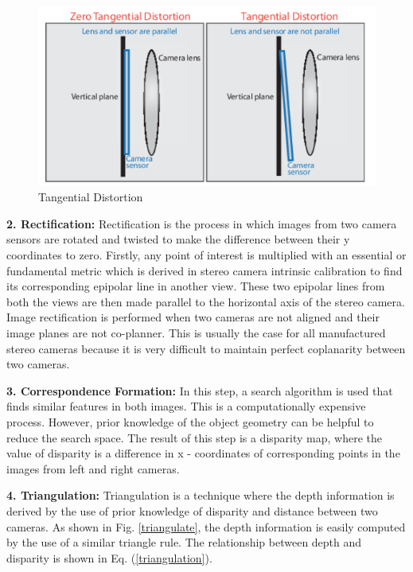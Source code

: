 \begin{figure}
    \centering
    \includegraphics[scale= 0.7]{Images/tangential.png}
    \caption{Tangential Distortion \cite{MATLAB_camera}}
    \label{tangential}
\end{figure}

\textbf{2. Rectification:}
Rectification is the process in which images from two camera sensors are rotated and twisted to make the difference between their y coordinates to zero. Firstly, any point of interest is multiplied with an essential or fundamental metric which is derived in stereo camera intrinsic calibration to find its corresponding epipolar line in another view. These two epipolar lines from both the views are then made parallel to the horizontal axis of the stereo camera. Image rectification is performed when two cameras are not aligned and their image planes are not co-planner. This is usually the case for all manufactured stereo cameras because it is very difficult to maintain perfect coplanarity between two cameras.   

\textbf{3. Correspondence Formation:}
In this step, a search algorithm is used that finds similar features in both images. This is a computationally expensive process. However, prior knowledge of the object geometry can be helpful to reduce the search space. The result of this step is a disparity map, where the value of disparity is a difference in x - coordinates of corresponding points in the images from left and right cameras. 

\textbf{4. Triangulation:}
Triangulation is a technique where the depth information is derived by the use of prior knowledge of disparity and distance between two cameras. As shown in Fig. \ref{triangulate}, the depth information is easily computed by the use of a similar triangle rule. The relationship between depth and disparity is shown in Eq. (\ref{triangulation}).

